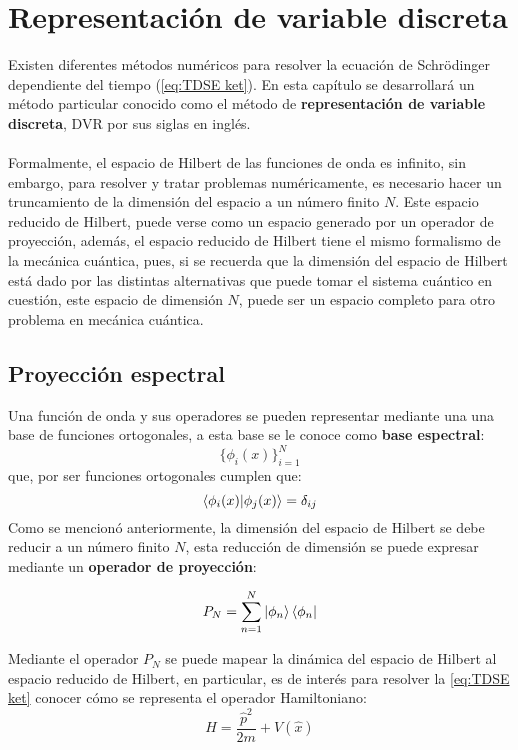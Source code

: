 \chapter{Representación de variable discreta}\label{ch:DVR}
Existen diferentes métodos numéricos para resolver la ecuación de Schrödinger dependiente del tiempo (\autoref{eq:TDSE ket}). En esta capítulo se desarrollará un método particular conocido como el método de \textbf{representación de variable discreta}, \acs{DVR} por sus siglas en inglés.
\\\\
Formalmente, el espacio de Hilbert de las funciones de onda es infinito, sin embargo, para resolver y tratar problemas numéricamente, es necesario hacer un truncamiento de la dimensión del espacio a un número finito $N$. Este espacio reducido de Hilbert, puede verse como un espacio generado por un operador de proyección, además, el espacio reducido de Hilbert tiene el mismo formalismo de la mecánica cuántica, pues, si se recuerda que la dimensión del espacio de Hilbert está dado por las distintas alternativas que puede tomar el sistema cuántico en cuestión, este espacio de dimensión $N$, puede ser un espacio completo para otro problema en mecánica cuántica.

\section{Proyección espectral}
Una función de onda y sus operadores se pueden representar mediante una una base de funciones ortogonales, a esta base se le conoce como \textbf{base espectral}:
$$\{\phi_i(x)\}_{i=1}^{N}$$
que, por ser funciones ortogonales cumplen que:
$$\bra{\phi_i(x)}\ket{\phi_j(x)} = \delta_{ij}$$
Como se mencionó anteriormente, la dimensión del espacio de Hilbert se debe reducir a un número finito $N$, esta reducción de dimensión se puede expresar mediante un \textbf{operador de proyección}:

\begin{equation}
  \label{eq:operadorproyeccion}
  P_N = \sum_{n=1}^N\ket{\phi_n}\bra{\phi_n}
\end{equation}

Mediante el operador $P_N$ se puede mapear la dinámica del espacio de Hilbert al espacio reducido de Hilbert, en particular, es de interés para resolver la \autoref{eq:TDSE ket} conocer cómo se representa el operador Hamiltoniano:
\begin{equation}
  \label{eq:Hamiltoniano}
  H = \frac{\hat{p}^2}{2m}+V(\hat{x})
\end{equation}

